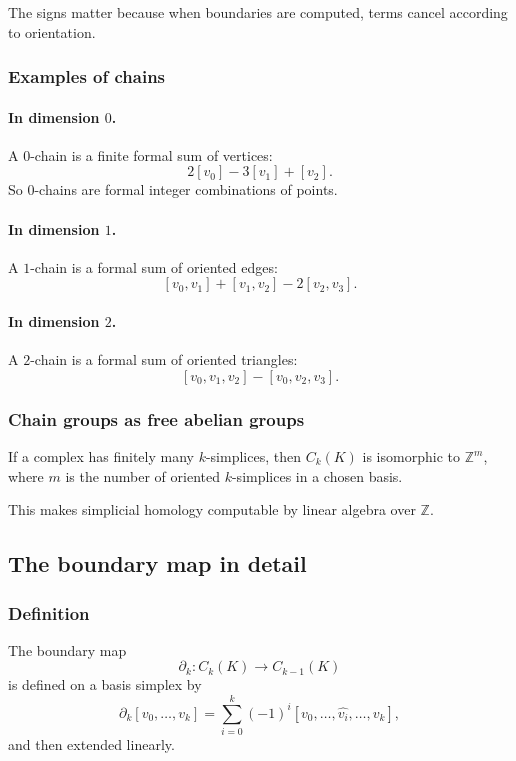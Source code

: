 \documentclass[12pt,a4paper]{article}
\theoremstyle{notespace}
\begin{document}
The signs matter because when boundaries are computed, terms cancel according to orientation.

\subsubsection{Examples of chains}

\paragraph{In dimension \(0\).}
A \(0\)-chain is a finite formal sum of vertices:
\[
2[v_0] - 3[v_1] + [v_2].
\]
So \(0\)-chains are formal integer combinations of points.

\paragraph{In dimension \(1\).}
A \(1\)-chain is a formal sum of oriented edges:
\[
[v_0,v_1] + [v_1,v_2] - 2[v_2,v_3].
\]

\paragraph{In dimension \(2\).}
A \(2\)-chain is a formal sum of oriented triangles:
\[
[v_0,v_1,v_2] - [v_0,v_2,v_3].
\]

\subsubsection{Chain groups as free abelian groups}

If a complex has finitely many \(k\)-simplices, then \(C_k(K)\) is isomorphic to \(\mathbb{Z}^m\), where \(m\) is the number of oriented \(k\)-simplices in a chosen basis.

This makes simplicial homology computable by linear algebra over \(\mathbb{Z}\).

\subsection{The boundary map in detail}

\subsubsection{Definition}

The boundary map
\[
\partial_k : C_k(K)\to C_{k-1}(K)
\]
is defined on a basis simplex by
\[
\partial_k[v_0,\dots,v_k]
=
\sum_{i=0}^k (-1)^i [v_0,\dots,\widehat{v_i},\dots,v_k],
\]
and then extended linearly.
\end{document}
